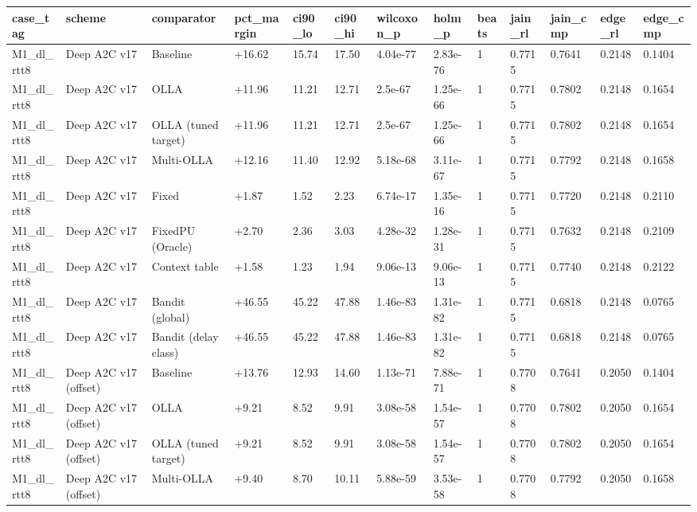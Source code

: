 \documentclass[10pt]{article}
\begin{document}
\begin{landscape}
\begin{longtable}{@{}lllllllllllll@{}}
\midrule
\endfirsthead
\toprule
\textbf{case\_tag} & \textbf{scheme} & \textbf{comparator} & \textbf{pct\_margin} & \textbf{ci90\_lo} & \textbf{ci90\_hi} & \textbf{wilcoxon\_p} & \textbf{holm\_p} & \textbf{beats} & \textbf{jain\_rl} & \textbf{jain\_cmp} & \textbf{edge\_rl} & \textbf{edge\_cmp} \\
\midrule
\endhead
M1\_dl\_rtt8 & Deep A2C v17 & Baseline & +16.62 & 15.74 & 17.50 & 4.04e-77 & 2.83e-76 & 1 & 0.7715 & 0.7641 & 0.2148 & 0.1404 \\
M1\_dl\_rtt8 & Deep A2C v17 & OLLA & +11.96 & 11.21 & 12.71 & 2.5e-67 & 1.25e-66 & 1 & 0.7715 & 0.7802 & 0.2148 & 0.1654 \\
M1\_dl\_rtt8 & Deep A2C v17 & OLLA (tuned target) & +11.96 & 11.21 & 12.71 & 2.5e-67 & 1.25e-66 & 1 & 0.7715 & 0.7802 & 0.2148 & 0.1654 \\
M1\_dl\_rtt8 & Deep A2C v17 & Multi-OLLA & +12.16 & 11.40 & 12.92 & 5.18e-68 & 3.11e-67 & 1 & 0.7715 & 0.7792 & 0.2148 & 0.1658 \\
M1\_dl\_rtt8 & Deep A2C v17 & Fixed & +1.87 & 1.52 & 2.23 & 6.74e-17 & 1.35e-16 & 1 & 0.7715 & 0.7720 & 0.2148 & 0.2110 \\
M1\_dl\_rtt8 & Deep A2C v17 & FixedPU (Oracle) & +2.70 & 2.36 & 3.03 & 4.28e-32 & 1.28e-31 & 1 & 0.7715 & 0.7632 & 0.2148 & 0.2109 \\
M1\_dl\_rtt8 & Deep A2C v17 & Context table & +1.58 & 1.23 & 1.94 & 9.06e-13 & 9.06e-13 & 1 & 0.7715 & 0.7740 & 0.2148 & 0.2122 \\
M1\_dl\_rtt8 & Deep A2C v17 & Bandit (global) & +46.55 & 45.22 & 47.88 & 1.46e-83 & 1.31e-82 & 1 & 0.7715 & 0.6818 & 0.2148 & 0.0765 \\
M1\_dl\_rtt8 & Deep A2C v17 & Bandit (delay class) & +46.55 & 45.22 & 47.88 & 1.46e-83 & 1.31e-82 & 1 & 0.7715 & 0.6818 & 0.2148 & 0.0765 \\
M1\_dl\_rtt8 & Deep A2C v17 (offset) & Baseline & +13.76 & 12.93 & 14.60 & 1.13e-71 & 7.88e-71 & 1 & 0.7708 & 0.7641 & 0.2050 & 0.1404 \\
M1\_dl\_rtt8 & Deep A2C v17 (offset) & OLLA & +9.21 & 8.52 & 9.91 & 3.08e-58 & 1.54e-57 & 1 & 0.7708 & 0.7802 & 0.2050 & 0.1654 \\
M1\_dl\_rtt8 & Deep A2C v17 (offset) & OLLA (tuned target) & +9.21 & 8.52 & 9.91 & 3.08e-58 & 1.54e-57 & 1 & 0.7708 & 0.7802 & 0.2050 & 0.1654 \\
M1\_dl\_rtt8 & Deep A2C v17 (offset) & Multi-OLLA & +9.40 & 8.70 & 10.11 & 5.88e-59 & 3.53e-58 & 1 & 0.7708 & 0.7792 & 0.2050 & 0.1658 \\

\end{longtable}
\end{landscape}
\end{document}
